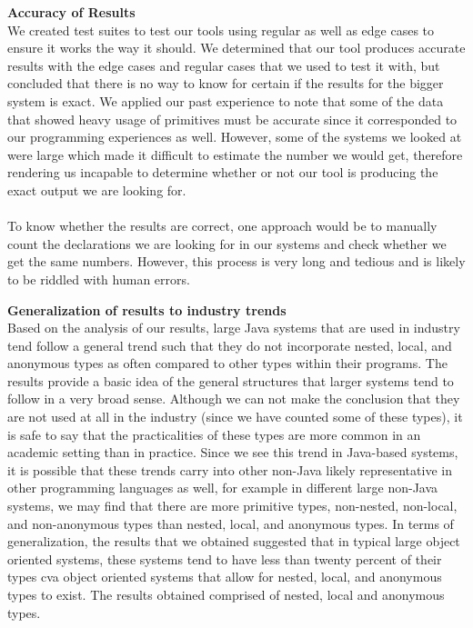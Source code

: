 \documentclass{assignment}
\begin{document}
\begin{enumerate}
\textbf{Accuracy of Results}\\

We created test suites to test our tools using regular as well as edge cases to ensure it works the way it should. We determined that our tool produces accurate results with the edge cases and regular cases that we used to test it with, but concluded that there is no way to know for certain if the results for the bigger system is exact. We applied our past experience to note that some of the data that showed heavy usage of primitives must be accurate since it corresponded to our programming experiences as well. However, some of the systems we looked at were large which made it difficult to estimate the number we would get, therefore rendering us incapable to determine whether or not our tool is producing the exact output we are looking for. \\
\\To know whether the results are correct, one approach would be to manually count the declarations we are looking for in our systems and check whether we get the same numbers. However, this process is very long and tedious and is likely to be riddled with human errors. 

\textbf{Generalization of results to industry trends}\\

Based on the analysis of our results, large Java systems that are used in industry tend follow a general trend such that they do not incorporate nested, local, and anonymous types as often compared to other types within their programs. The results provide a basic idea of the general structures that larger systems tend to follow in a very broad sense. Although we can not make the conclusion that they are not used at all in the industry (since we have counted some of these types), it is safe to say that the practicalities of these types are more common in an academic setting than in practice. Since we see this trend in Java-based systems, it is possible that these trends carry into other non-Java likely representative in other programming languages as well, for example in different large non-Java systems, we may find that there are more primitive types, non-nested, non-local, and non-anonymous types than nested, local, and anonymous types. In terms of generalization, the results that we obtained suggested that in typical large object oriented systems, these systems tend to have less than twenty percent of their types cva object oriented systems that allow for nested, local, and anonymous types to exist. The results obtained comprised of nested, local and anonymous types.\\


\end{enumerate}
\end{document}
